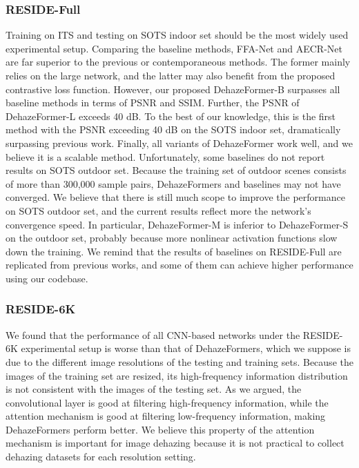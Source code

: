 \documentclass[journal]{IEEEtran}
\begin{document}
\subsubsection{RESIDE-Full}
Training on ITS and testing on SOTS indoor set should be the most widely used experimental setup.
Comparing the baseline methods, FFA-Net and AECR-Net are far superior to the previous or contemporaneous methods. 
The former mainly relies on the large network, and the latter may also benefit from the proposed contrastive loss function.
However, our proposed DehazeFormer-B surpasses all baseline methods in terms of PSNR and SSIM.
Further, the PSNR of DehazeFormer-L exceeds 40 dB. 
To the best of our knowledge, this is the first method with the PSNR exceeding 40 dB on the SOTS indoor set, dramatically surpassing previous work.
Finally, all variants of DehazeFormer work well, and we believe it is a scalable method.
Unfortunately, some baselines do not report results on SOTS outdoor set.
Because the training set of outdoor scenes consists of more than 300,000 sample pairs, DehazeFormers and baselines may not have converged. 
We believe that there is still much scope to improve the performance on SOTS outdoor set, and the current results reflect more the network's convergence speed.
In particular, DehazeFormer-M is inferior to DehazeFormer-S on the outdoor set, probably because more nonlinear activation functions slow down the training.
We remind that the results of baselines on RESIDE-Full are replicated from previous works, and some of them can achieve higher performance using our codebase.

\subsubsection{RESIDE-6K}
We found that the performance of all CNN-based networks under the RESIDE-6K experimental setup is worse than that of DehazeFormers, which we suppose is due to the different image resolutions of the testing and training sets.
Because the images of the training set are resized, its high-frequency information distribution is not consistent with the images of the testing set.
As we argued, the convolutional layer is good at filtering high-frequency information, while the attention mechanism is good at filtering low-frequency information, making DehazeFormers perform better.
We believe this property of the attention mechanism is important for image dehazing because it is not practical to collect dehazing datasets for each resolution setting.
\end{document}
